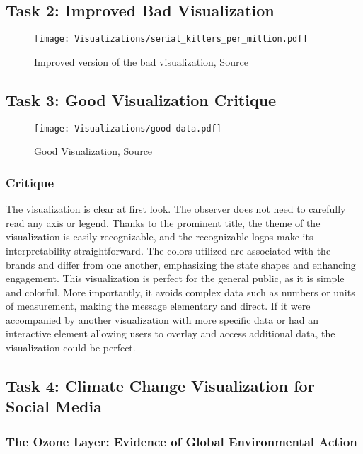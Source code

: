 \documentclass[a4paper,landscape]{article}
\begin{document}
\subsection{Task 2: Improved Bad Visualization}
\begin{figure}[H]
    \centering
    \texttt{[image: Visualizations/serial\_killers\_per\_million.pdf]} %
    \caption{Improved version of the bad visualization, Source\cite{worldatlas2025serialkillers}}
    \label{fig:improved}
\end{figure}

\subsection{Task 3: Good Visualization Critique}
\begin{figure}[H]
    \centering
    \texttt{[image: Visualizations/good-data.pdf]} %
    \caption{Good Visualization, Source \cite{reddit2025cyberbrands}}
    \label{fig:good}
\end{figure}
\subsubsection{Critique}
The visualization is clear at first look. The observer does not need to carefully read any axis or legend. Thanks to the prominent title, the theme of the visualization is easily recognizable, and the recognizable logos make its interpretability straightforward. The colors utilized are associated with the brands and differ from one another, emphasizing the state shapes and enhancing engagement. This visualization is perfect for the general public, as it is simple and colorful. More importantly, it avoids complex data such as numbers or units of measurement, making the message elementary and direct. If it were accompanied by another visualization with more specific data or had an interactive element allowing users to overlay and access additional data, the visualization could be perfect.

\subsection{Task 4: Climate Change Visualization for Social Media}
\subsubsection{The Ozone Layer: Evidence of Global Environmental Action}
\end{document}
